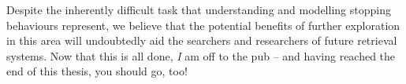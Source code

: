 Despite the inherently difficult task that understanding and modelling stopping behaviours represent, we believe that the potential benefits of further exploration in this area will undoubtedly aid the searchers and researchers of future retrieval systems. Now that this is all done, \emph{I} am off to the pub -- and having reached the end of this thesis, you should go, too!

